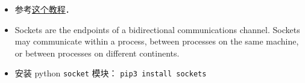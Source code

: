 
\begin{itemize}
\item 参考\href{https://www.tutorialspoint.com/python/python_networking.htm}{这个教程}．
\item Sockets are the endpoints of a bidirectional communications channel. Sockets may communicate within a process, between processes on the same machine, or between processes on different continents.
\item 安装 python \verb|socket| 模块： \verb|pip3 install sockets|
\end{itemize}
